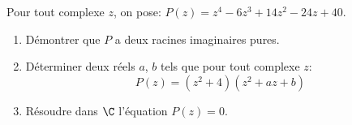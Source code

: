 \begin{exercice}
Pour tout complexe $z$, on pose: $P(z)=z^4-6z^3+14z^2-24z+40$.
  \begin{enumerate}
  \item D\'emontrer que $P$ a deux racines imaginaires pures.

  \item D\'eterminer deux  r\'eels $a$, $b$ tels que pour tout complexe $z$:
\[ P(z)=(z^2+4)(z^2+az+b)\]
\item R\'esoudre dans $\C$ l'\'equation $P(z)=0$.
  \end{enumerate}
 
\end{exercice}
